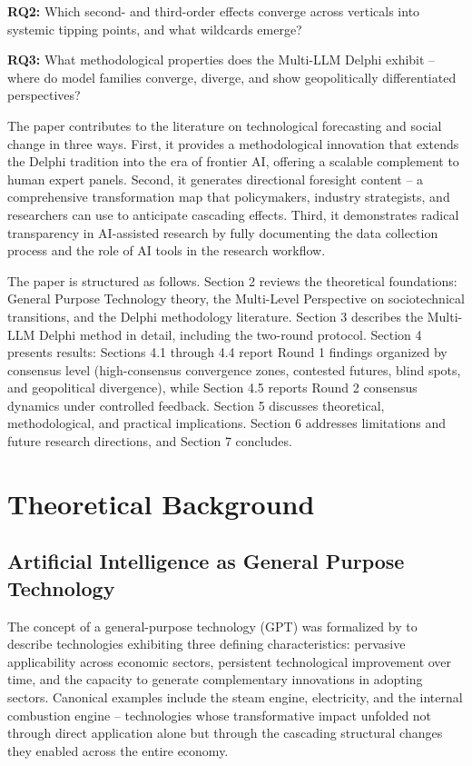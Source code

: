 \documentclass[preprint,review,12pt]{elsarticle}
\begin{document}
\textbf{RQ2:} Which second- and third-order effects converge across verticals into systemic tipping points, and what wildcards emerge?

\textbf{RQ3:} What methodological properties does the Multi-LLM Delphi exhibit -- where do model families converge, diverge, and show geopolitically differentiated perspectives?

The paper contributes to the literature on technological forecasting and social change in three ways. First, it provides a methodological innovation that extends the Delphi tradition into the era of frontier AI, offering a scalable complement to human expert panels. Second, it generates directional foresight content -- a comprehensive transformation map that policymakers, industry strategists, and researchers can use to anticipate cascading effects. Third, it demonstrates radical transparency in AI-assisted research by fully documenting the data collection process and the role of AI tools in the research workflow.

The paper is structured as follows. Section 2 reviews the theoretical foundations: General Purpose Technology theory, the Multi-Level Perspective on sociotechnical transitions, and the Delphi methodology literature. Section 3 describes the Multi-LLM Delphi method in detail, including the two-round protocol. Section 4 presents results: Sections 4.1 through 4.4 report Round 1 findings organized by consensus level (high-consensus convergence zones, contested futures, blind spots, and geopolitical divergence), while Section 4.5 reports Round 2 consensus dynamics under controlled feedback. Section 5 discusses theoretical, methodological, and practical implications. Section 6 addresses limitations and future research directions, and Section 7 concludes.



\section{Theoretical Background}
\label{sec:theoretical_background}


\subsection{Artificial Intelligence as General Purpose Technology}
\label{sec:ai_as_gpt}

The concept of a general-purpose technology (GPT) was formalized by \citet{bresnahan1995gpt} to describe technologies exhibiting three defining characteristics: pervasive applicability across economic sectors, persistent technological improvement over time, and the capacity to generate complementary innovations in adopting sectors. Canonical examples include the steam engine, electricity, and the internal combustion engine -- technologies whose transformative impact unfolded not through direct application alone but through the cascading structural changes they enabled across the entire economy.
\end{document}
